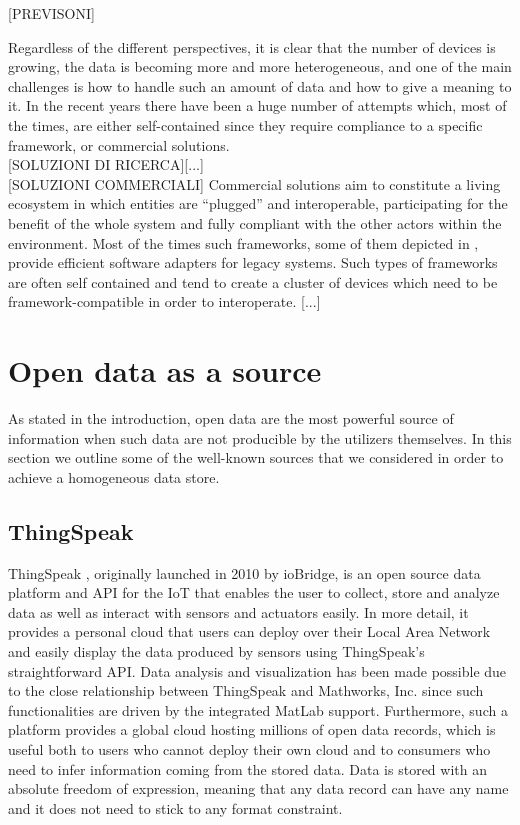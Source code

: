 \documentclass[conference]{IEEEtran}
\begin{document}
[PREVISONI]
 
Regardless of the different perspectives, it is clear that the number of devices is growing, the data is becoming more and more heterogeneous, and one of the main challenges is how to handle such an amount of data and how to give a meaning to it.
In the recent years there have been a huge number of attempts which, most of the times, are either self-contained since they require compliance to a specific framework, or commercial solutions.
\\

[SOLUZIONI DI RICERCA][...]
\\

[SOLUZIONI COMMERCIALI]
Commercial solutions aim to constitute a living ecosystem in which entities are ``plugged'' and interoperable, participating for the benefit of the whole system and fully compliant with the other actors within the environment.
Most of the times such frameworks, some of them depicted in \cite{derhamy2015survey}, provide efficient software adapters for legacy systems.
Such types of frameworks are often self contained and tend to create a cluster of devices which need to be framework-compatible in order to interoperate.
[...]



\section{Open data as a source}

As stated in the introduction, open data are the most powerful source of information when such data are not producible by the utilizers themselves.
In this section we outline some of the well-known sources that we considered in order to achieve a homogeneous data store.

\subsection*{ThingSpeak}
ThingSpeak \cite{thingspeak}, originally launched in 2010 by ioBridge, is an open source data platform and API for the IoT that enables the user to collect, store and analyze data as well as interact with sensors and actuators easily.
In more detail, it provides a personal cloud that users can deploy over their Local Area Network and easily display the data produced by sensors using ThingSpeak's straightforward API.
Data analysis and visualization has been made possible due to the close relationship between ThingSpeak and Mathworks, Inc. since such functionalities are driven by the integrated MatLab support. 
Furthermore, such a platform provides a global cloud hosting millions of open data records, which is useful both to users who cannot deploy their own cloud and to consumers who need to infer information coming from the stored data.
Data is stored with an absolute freedom of expression, meaning that any data record can have any name and it does not need to stick to any format constraint.
\end{document}
